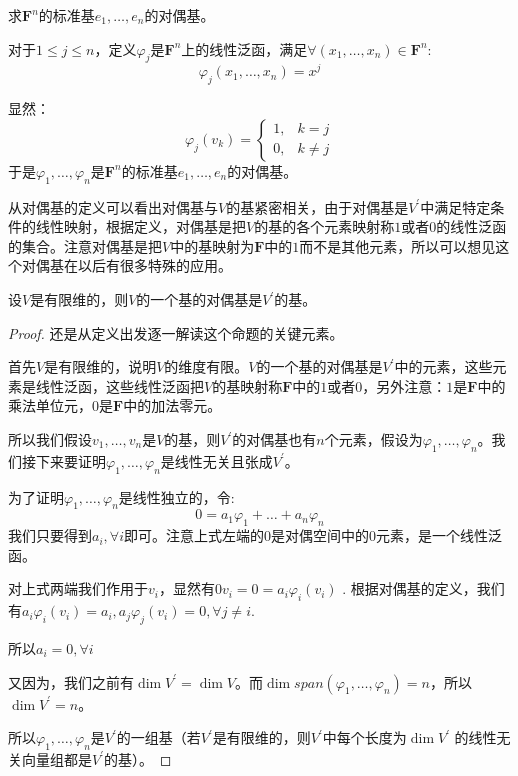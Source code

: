 \documentclass[10pt,a4paper,UTF8]{article}
\begin{document}
\begin{instance}
求\(\mathbf{F}^{n}\)的标准基\(e_{1},\ldots ,e_{n}\)的对偶基。

对于\(1\leq j \leq n\)，定义\(\varphi_{j}\)是\(\mathbf{F}^{n}\)上的线性泛函，满足\(\forall (x_{1},\ldots ,x_{n})\in \mathbf{F}^{n}\):
\begin{equation}
\label{eq:2}
\varphi_{j}(x_{1},\ldots ,x_{n}) = x^{j}
\end{equation}

显然：
\begin{equation}
\label{eq:3}
\varphi_{j}(v_{k}) = 
\begin{cases}
1, & k=j \\
0, & k\neq j 
\end{cases}
\end{equation}
于是\(\varphi_{1},\ldots ,\varphi_{n}\)是\(\mathbf{F}^{n}\)的标准基\(e_{1},\ldots ,e_{n}\)的对偶基。

从对偶基的定义可以看出对偶基与\(V\)的基紧密相关，由于对偶基是\(V^{'}\)中满足特定条件的线性映射，根据定义，对偶基是把\(V\)的基的各个元素映射称\(1\)或者\(0\)的线性泛函的集合。注意对偶基是把\(V\)中的基映射为\(\mathbf{F}\)中的\(1\)而不是其他元素，所以可以想见这个对偶基在以后有很多特殊的应用。
\end{instance}

\begin{theorem}
设\(V\)是有限维的，则\(V\)的一个基的对偶基是\(V^{'}\)的基。
\end{theorem}

\begin{proof}
还是从定义出发逐一解读这个命题的关键元素。

首先\(V\)是有限维的，说明\(V\)的维度有限。\(V\)的一个基的对偶基是\(V^{'}\)中的元素，这些元素是线性泛函，这些线性泛函把\(V\)的基映射称\(\mathbf{F}\)中的\(1\)或者\(0\)，另外注意：\(1\)是\(\mathbf{F}\)中的乘法单位元，\(0\)是\(\mathbf{F}\)中的加法零元。

所以我们假设\(v_{1},\ldots ,v_{n}\)是\(V\)的基，则\(V^{'}\)的对偶基也有\(n\)个元素，假设为\(\varphi_{1},\ldots ,\varphi_{n}\)。我们接下来要证明\(\varphi_{1},\ldots ,\varphi_{n}\)是线性无关且张成\(V^{'}\)。

为了证明\(\varphi_{1},\ldots ,\varphi_{n}\)是线性独立的，令:
\begin{equation}
\label{eq:4}
0 = a_{1}\varphi_{1} + \ldots + a_{n}\varphi_{n}
\end{equation}
我们只要得到\(a_{i},\forall i\)即可。注意上式左端的\(0\)是对偶空间中的\(0\)元素，是一个线性泛函。

对上式两端我们作用于\(v_{i}\)，显然有\(0v_{i} = 0 = a_{i}\varphi_{i}(v_{i})\) . 根据对偶基的定义，我们有\(a_{i}\varphi_{i}(v_{i}) = a_{i}, a_{j}\varphi_{j}(v_{i}) = 0, \forall j\neq i\).

所以\(a_{i} = 0, \forall i\)

又因为，我们之前有\(\dim V^{'} = \dim V\)。而\(\dim span(\varphi_{1},\ldots ,\varphi_{n}) = n\)，所以\(\dim V^{'} = n\)。

所以\(\varphi_{1},\ldots ,\varphi_{n}\)是\(V^{'}\)的一组基（若\(V^{'}\)是有限维的，则\(V^{'}\)中每个长度为\(\dim V^{'}\) 的线性无关向量组都是\(V^{'}\)的基）。
\end{proof}
\end{document}
